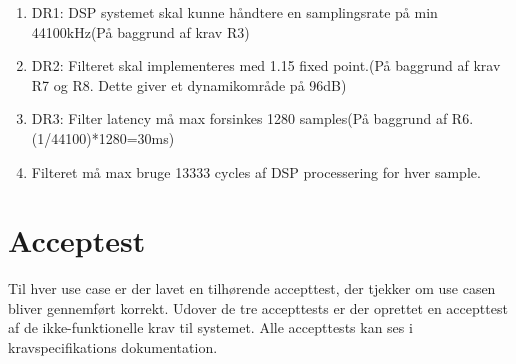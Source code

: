 \begin{enumerate}
	\item DR1: DSP systemet skal kunne håndtere en samplingsrate på min 44100kHz(På baggrund af krav R3) 
	
	\item DR2: Filteret skal implementeres med 1.15 fixed point.(På baggrund af krav R7 og R8. Dette giver et dynamikområde på 96dB)
	
	\item DR3: Filter latency må max forsinkes 1280 samples(På baggrund af R6. (1/44100)*1280=30ms)
	
	\item Filteret må max bruge 13333 cycles af DSP processering for hver sample. 
	
\end{enumerate}


\section{Acceptest}
Til hver use case er der lavet en tilhørende accepttest, der tjekker om use casen bliver gennemført korrekt. Udover de tre accepttests er der oprettet en accepttest af de ikke-funktionelle krav til systemet. Alle accepttests kan ses
i kravspecifikations dokumentation.